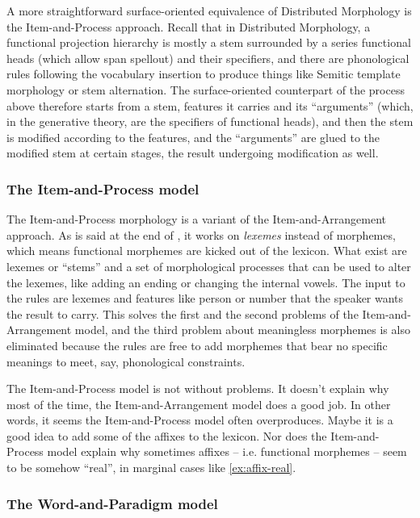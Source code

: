\documentclass[UTF8, a4paper, oneside, scheme=plain]{ctexart}
\begin{document}
A more straightforward surface-oriented equivalence of Distributed Morphology
is the Item-and-Process approach.
Recall that in Distributed Morphology, a functional projection hierarchy
is mostly a stem surrounded by a series functional heads (which allow span spellout) and their specifiers,
and there are phonological rules following the vocabulary insertion 
to produce things like Semitic template morphology \citet{tucker2011morphosyntax}
or stem alternation.
The surface-oriented counterpart of the process above 
therefore starts from a stem, features it carries and its ``arguments''
(which, in the generative theory, are the specifiers of functional heads),
and then the stem is modified according to the features,
and the ``arguments'' are glued to the modified stem at certain stages,
the result undergoing modification as well.

\subsubsection{The Item-and-Process model}

The Item-and-Process morphology is a variant of the Item-and-Arrangement approach.
As is said at the end of ,
it works on \emph{lexemes} instead of morphemes,
which means functional morphemes are kicked out of the lexicon.
What exist are lexemes or ``stems'' and a set of morphological processes 
that can be used to alter the lexemes,
like adding an ending or changing the internal vowels.
The input to the rules are lexemes and 
features like person or number that the speaker wants the result to carry.
This solves the first and the second problems of the Item-and-Arrangement model,
and the third problem about meaningless morphemes 
is also eliminated because 
the rules are free to add morphemes that bear no specific meanings 
to meet, say, phonological constraints.

The Item-and-Process model is not without problems.
It doesn't explain why most of the time,
the Item-and-Arrangement model does a good job.
In other words,
it seems the Item-and-Process model often overproduces.
Maybe it is a good idea to add some of the affixes to the lexicon.
Nor does the Item-and-Process model 
explain why sometimes affixes -- i.e. functional morphemes -- seem to be somehow ``real'',
in marginal cases like \eqref{ex:affix-real}.

\subsubsection{The Word-and-Paradigm model}
\end{document}
